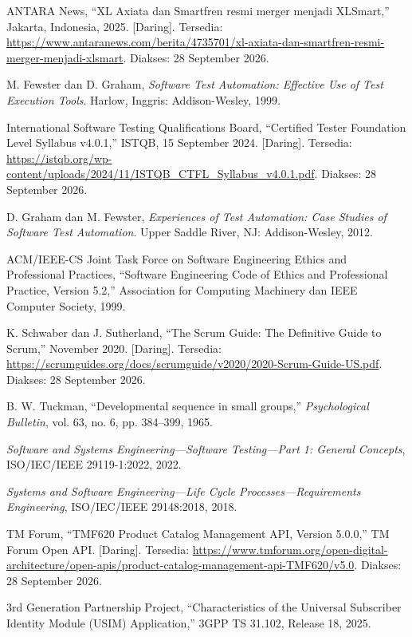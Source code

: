 \documentclass[12pt,a4paper]{article}
\begin{document}
\noindent
\begin{enumerate}[label={[\arabic*]},leftmargin=2.2em,itemsep=6pt,topsep=2pt]
    \item ANTARA News, ``XL Axiata dan Smartfren resmi merger menjadi XLSmart,'' Jakarta, Indonesia, 2025. [Daring]. Tersedia: \url{https://www.antaranews.com/berita/4735701/xl-axiata-dan-smartfren-resmi-merger-menjadi-xlsmart}. Diakses: 28 September 2026.
    \item M. Fewster dan D. Graham, \textit{Software Test Automation: Effective Use of Test Execution Tools}. Harlow, Inggris: Addison-Wesley, 1999.
    \item International Software Testing Qualifications Board, ``Certified Tester Foundation Level Syllabus v4.0.1,'' ISTQB, 15 September 2024. [Daring]. Tersedia: \url{https://istqb.org/wp-content/uploads/2024/11/ISTQB_CTFL_Syllabus_v4.0.1.pdf}. Diakses: 28 September 2026.
    \item D. Graham dan M. Fewster, \textit{Experiences of Test Automation: Case Studies of Software Test Automation}. Upper Saddle River, NJ: Addison-Wesley, 2012.
    \item ACM/IEEE-CS Joint Task Force on Software Engineering Ethics and Professional Practices, ``Software Engineering Code of Ethics and Professional Practice, Version 5.2,'' Association for Computing Machinery dan IEEE Computer Society, 1999.
    \item K. Schwaber dan J. Sutherland, ``The Scrum Guide: The Definitive Guide to Scrum,'' November 2020. [Daring]. Tersedia: \url{https://scrumguides.org/docs/scrumguide/v2020/2020-Scrum-Guide-US.pdf}. Diakses: 28 September 2026.
    \item B. W. Tuckman, ``Developmental sequence in small groups,'' \textit{Psychological Bulletin}, vol. 63, no. 6, pp. 384--399, 1965.
    \item \textit{Software and Systems Engineering---Software Testing---Part 1: General Concepts}, ISO/IEC/IEEE 29119-1:2022, 2022.
    \item \textit{Systems and Software Engineering---Life Cycle Processes---Requirements Engineering}, ISO/IEC/IEEE 29148:2018, 2018.
    \item TM Forum, ``TMF620 Product Catalog Management API, Version 5.0.0,'' TM Forum Open API. [Daring]. Tersedia: \url{https://www.tmforum.org/open-digital-architecture/open-apis/product-catalog-management-api-TMF620/v5.0}. Diakses: 28 September 2026.
    \item 3rd Generation Partnership Project, ``Characteristics of the Universal Subscriber Identity Module (USIM) Application,'' 3GPP TS 31.102, Release 18, 2025.

\end{enumerate}
\end{document}
